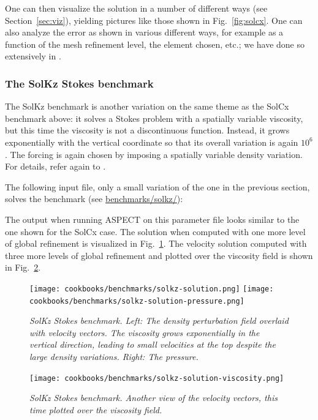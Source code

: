 \documentclass{article}
\newcommand{\aspect}{\textsc{ASPECT}}
\begin{document}
One can then visualize the solution in a number of different ways (see
Section~\ref{sec:viz}), yielding pictures like those shown in
Fig.~\ref{fig:solcx}. One can also analyze the error as shown in various
different ways, for example as a function of the mesh refinement level, the
element chosen, etc.; we have done so extensively in \cite{KHB12}.


\subsubsection{The SolKz Stokes benchmark}
\label{sec:benchmark-solkz}

The SolKz benchmark is another variation on the same theme as the SolCx
benchmark above: it solves a Stokes problem with a spatially variable
viscosity, but this time the viscosity is not a discontinuous function. Instead,
it grows exponentially with the vertical coordinate so that its overall
variation is again $10^6$. The forcing is again chosen by imposing a spatially
variable density variation. For details, refer again to \cite{DMGT11}.

The following input file, only a small variation of the one in the previous
section, solves the benchmark (see \url{benchmarks/solkz/}):



The output when running \aspect{} on this parameter file looks similar to the
one shown for the SolCx case. The solution when computed with one more level
of global refinement is visualized in Fig.~\ref{fig:solkz}. The velocity solution
computed with three more levels of global refinement and plotted over the viscosity
field is shown in Fig.~\ref{fig:solkz2}.

\begin{figure}
  \begin{center}
    \texttt{[image: cookbooks/benchmarks/solkz-solution.png]}
    \hfill
    \texttt{[image: cookbooks/benchmarks/solkz-solution-pressure.png]}
    \caption{\it SolKz Stokes benchmark. Left: The density perturbation field
    overlaid with velocity vectors. The viscosity grows exponentially
      in the vertical direction, leading to small velocities at the top
      despite the large density variations. Right: The pressure.}
    \label{fig:solkz}
  \end{center}
\end{figure}

\begin{figure}
  \begin{center}
    \texttt{[image: cookbooks/benchmarks/solkz-solution-viscosity.png]}
    \caption{\it SolKz Stokes benchmark. Another view of the velocity vectors, this time plotted over the viscosity field.}
    \label{fig:solkz2}
  \end{center}
\end{figure}
\end{document}
